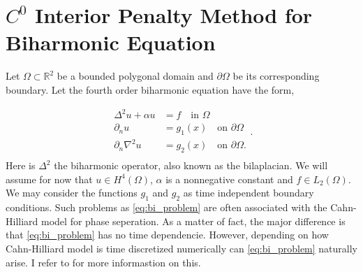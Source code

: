\newpage
\section{ $C^0$ Interior Penalty Method for Biharmonic Equation}
\label{sec:ch1}


Let $\Omega \subset   \mathbb{R} ^2$ be a bounded polygonal domain and $\partial \Omega $ be its corresponding boundary. Let the fourth order biharmonic equation have the form,

\begin{equation}
\label{eq:bi_problem}
\begin{split}
    \Delta^2  u  + \alpha  u  & = f \quad \text{in } \Omega   \\
    \partial _{n} u & = g_1\left( x \right)  \quad \text{on } \partial \Omega  \\
    \partial _{n} \nabla ^2 u & = g_{2}\left( x \right)  \quad \text{on } \partial \Omega .  \\
\end{split}
.\end{equation}
Here is $\Delta ^2$ the biharmonic operator, also known as the bilaplacian. We will assume for now that $u \in H^{4}\left( \Omega  \right) $, $\alpha $ is a nonnegative constant and $f \in L_{2}\left( \Omega  \right) $. We may consider the functions $g_{1}$ and $g_{2}$ as time independent boundary conditions. Such problems as \eqref{eq:bi_problem} are often associated with the Cahn-Hilliard model
\cite{cahnhilliard1957} for phase seperation. As a matter of fact, the major difference is that \eqref{eq:bi_problem}
has no time dependencie. However, depending on how Cahn-Hilliard model is time discretized numerically can
\eqref{eq:bi_problem} naturally arise. I refer to \cite{brenner2012quadratic} for more informastion on this.

